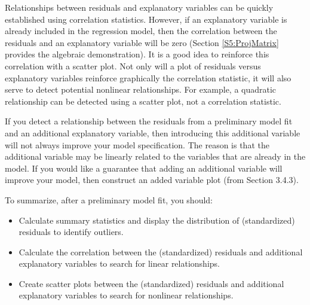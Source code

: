 Relationships between residuals and explanatory variables can be
quickly established using correlation statistics. However, if an
explanatory variable is already included in the regression model,
then the correlation between the residuals and an explanatory
variable will be zero (Section \ref{S5:ProjMatrix} provides the
algebraic demonstration). It is a good idea to reinforce this
correlation with a scatter plot. Not only will a plot of residuals
versus explanatory variables reinforce graphically the correlation
statistic, it will also serve to detect potential nonlinear
relationships. For example, a quadratic relationship can be detected
using a scatter plot, not a correlation statistic.

If you detect a relationship between the residuals from a
preliminary model fit and an additional explanatory variable, then
introducing this additional variable will not always improve your
model specification. The reason is that the additional variable may
be linearly related to the variables that are already in the model.
If you would like a guarantee that adding an additional variable
will improve your model, then construct an added variable plot (from
Section 3.4.3). 

To summarize, after a preliminary model fit, you should:
\begin{itemize}
\item Calculate summary statistics and display the distribution of
(standardized) residuals to identify outliers.

\item  Calculate the correlation between the (standardized) residuals and
additional explanatory variables to search for linear relationships.

\item  Create scatter plots between the (standardized) residuals and additional
explanatory variables to search for nonlinear relationships.
\end{itemize}

\linejed


